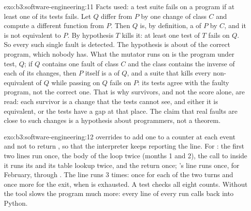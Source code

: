 \begin{solution}{exo:b3:software-engineering:11}
Facts used: a test suite fails on a program if at least one of its tests fails. Let $Q$ differ from $P$ by one change of class $C$ and compute a different function from $P$. Then $Q$ is, by definition, a  of $P$ by $C$, and it is not equivalent to $P$. By hypothesis $T$ kills it: at least one test of $T$ fails on $Q$. So every such single fault is detected. The hypothesis is about  of the correct program, which nobody has. What the mutator runs on is the program under test, $Q$; if $Q$ contains one fault of class $C$ and the class contains the inverse of each of its changes, then $P$ itself is a  of $Q$, and a suite that kills every non-equivalent  of $Q$ while passing on $Q$ fails on $P$: its tests agree with the faulty program, not the correct one. That is why survivors, and not the score alone, are read: each survivor is a change that the tests cannot see, and either it is equivalent, or the tests have a gap at that place. The claim that real faults are close to such changes is a hypothesis about programmers, not a theorem.
\end{solution}

\begin{solution}{exo:b3:software-engineering:12}
 overrides  to add one to a counter at each event and not to return , so that the interpreter keeps reporting the line. For : the first two lines run once, the body of the loop twice (months 1 and 2), the call to  inside it runs its  and its table lookup twice, and the return once; 's line runs once, for February, through . The  line runs 3 times: once for each of the two turns and once more for the exit, when  is exhausted. A test checks all eight counts. Without  the tool slows the program much more: every line of every run calls back into Python.
\end{solution}

